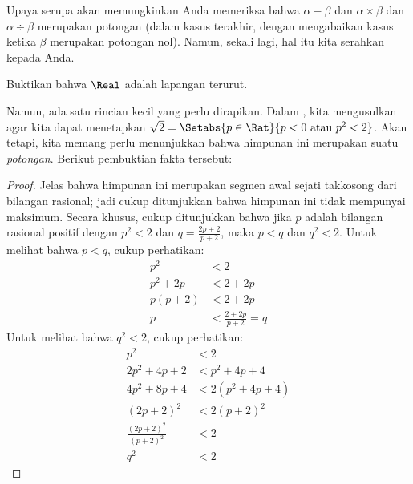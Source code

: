 \documentclass[../../../include/open-logic-section]{subfiles}
\begin{document}
Upaya serupa akan memungkinkan Anda memeriksa bahwa $\alpha - \beta$ dan
$\alpha \times \beta$ dan $\alpha \div \beta$ merupakan potongan (dalam kasus
terakhir, dengan mengabaikan kasus ketika $\beta$ merupakan potongan nol).
Namun, sekali lagi, hal itu kita serahkan kepada Anda.

\begin{prob}
Buktikan bahwa $\Real$ adalah lapangan terurut.
\end{prob}

Namun, ada satu rincian kecil yang perlu dirapikan. Dalam
, kita mengusulkan agar kita dapat menetapkan $\sqrt{2} =
\Setabs{p \in \Rat}{p < 0 \text{ atau }p^2 < 2}$. Akan tetapi, kita memang
perlu menunjukkan bahwa himpunan ini merupakan suatu \emph{potongan}. Berikut
pembuktian fakta tersebut:

\begin{proof}
Jelas bahwa himpunan ini merupakan segmen awal sejati takkosong dari bilangan
rasional; jadi cukup ditunjukkan bahwa himpunan ini tidak mempunyai maksimum.
Secara khusus, cukup ditunjukkan bahwa jika $p$ adalah bilangan rasional
positif dengan $p^2 < 2$ dan $q = \frac{2p+2}{p+2}$, maka $p < q$ dan $q^2 <
2$. Untuk melihat bahwa $p < q$, cukup perhatikan:
\begin{align*}
	p^2 &< 2\\
	p^2 + 2p &< 2 + 2p\\
	p(p + 2) &< 2 + 2p\\
	p &< \tfrac{2+2p}{p+2} = q
\end{align*}
Untuk melihat bahwa $q^2 < 2$, cukup perhatikan:
\begin{align*}
	p^2 &< 2\\
	2p^2 + 4p + 2 &< p^2 + 4p+ 4\\
	4p^2 + 8p + 4 &< 2(p^2 + 4p + 4)\\
	(2p+2)^2 & <2(p+2)^2\\
	\tfrac{(2p+2)^2}{(p+2)^2} &< 2\\
	q^2 &< 2
\end{align*}
\end{proof}
\end{document}
